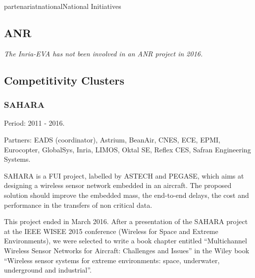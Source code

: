 \documentclass{ra2016}
\begin{document}

\begin{module}{partenariat}{national}{National Initiatives}


\subsection{ANR}

\textit{The Inria-EVA has not been involved in an ANR project in 2016.}

\subsection{Competitivity Clusters}

\subsubsection{SAHARA}

\begin{participants}
\end{participants}

Period: 2011 - 2016.

Partners: EADS (coordinator), Astrium, BeanAir, CNES, ECE, EPMI, Eurocopter, GlobalSys, Inria, LIMOS, Oktal SE, Reflex CES, Safran Engineering Systems.

SAHARA is a FUI project, labelled by ASTECH and PEGASE, which aims at designing a wireless sensor network embedded in an aircraft. The proposed solution should improve the embedded mass, the end-to-end delays, the cost and performance in the transfers of non critical data. 

This project ended in March 2016. After a presentation of the SAHARA project at the IEEE WISEE 2015 conference (Wireless for Space and Extreme Environments), we were selected to write a book chapter entitled ``Multichannel Wireless Sensor Networks for Aircraft: Challenges and Issues'' in the Wiley book
``Wireless sensor systems for extreme environments: space, underwater, underground and industrial''. 


\end{module}
\end{document}
